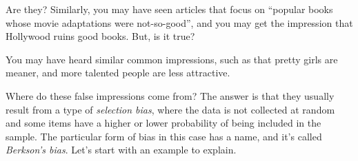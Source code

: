 Are they? Similarly, you may have seen articles that focus on ``popular books whose 
movie adaptations were not-so-good'', and you may get the impression that 
Hollywood ruins good books. But, is it true?

You may have heard similar common impressions, such as
that pretty girls are meaner, and more talented people are less attractive.

Where do these false impressions come from? The answer is that 
they usually result from a type of \emph{selection bias}, where the data
is not collected at random and some items have a higher or lower probability
of being included in the sample. The particular form of bias in this case has a name,
and it's called \emph{Berkson's bias}. Let's start with an example to explain.

